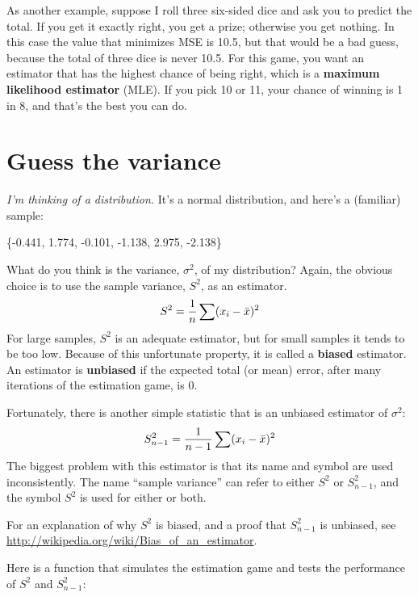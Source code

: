 \documentclass[12pt]{book}
\begin{document}
As another example, suppose I roll three six-sided dice and ask you to
predict the total.  If you get it exactly right, you get a prize;
otherwise you get nothing.  In this case the value that minimizes MSE
is 10.5, but that would be a bad guess, because the total of three
dice is never 10.5.  For this game, you want an estimator that has the
highest chance of being right, which is a {\bf maximum likelihood
  estimator} (MLE).  If you pick 10 or 11, your chance of winning is 1
in 8, and that's the best you can do.   


\section{Guess the variance}

{\em I'm thinking of a distribution.}  It's a normal distribution, and 
here's a (familiar) sample:

\{-0.441, 1.774, -0.101, -1.138, 2.975, -2.138\}

What do you think is the variance, $\sigma^2$, of my distribution?
Again, the obvious choice is to use the sample variance, $S^2$, as an
estimator.
%
\[ S^2 = \frac{1}{n} \sum (x_i - \bar{x})^2 \] 
%
For large samples, $S^2$ is an adequate estimator, but for small
samples it tends to be too low.  Because of this unfortunate
property, it is called a {\bf biased} estimator.
An estimator is {\bf unbiased} if the expected total (or mean) error,
after many iterations of the estimation game, is 0.

Fortunately, there is another simple statistic that is an unbiased
estimator of $\sigma^2$:
%
\[ S_{n-1}^2 = \frac{1}{n-1} \sum (x_i - \bar{x})^2 \] 
%
The biggest problem with this estimator is that its name and symbol
are used inconsistently.  The name ``sample variance'' can refer to
either $S^2$ or $S_{n-1}^2$, and the symbol $S^2$ is used
for either or both.

For an explanation of why $S^2$ is biased, and a proof that
$S_{n-1}^2$ is unbiased, see
\url{http://wikipedia.org/wiki/Bias_of_an_estimator}.

Here is a function that simulates the estimation game and tests
the performance of $S^2$ and $S_{n-1}^2$:
\end{document}
